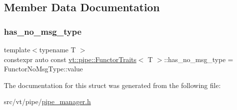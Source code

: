 \subsection{Member Data Documentation}
\mbox{\label{structvt_1_1pipe_1_1_functor_traits_aace8b00c70112f7711ce73f1799f7e00}} 
\subsubsection{\texorpdfstring{has\+\_\+no\+\_\+msg\+\_\+type}{has\_no\_msg\_type}}
{\footnotesize\ttfamily template$<$typename T $>$ \\
constexpr auto const \hyperlink{structvt_1_1pipe_1_1_functor_traits}{vt\+::pipe\+::\+Functor\+Traits}$<$ T $>$\+::has\+\_\+no\+\_\+msg\+\_\+type = Functor\+No\+Msg\+Type\+::value\hspace{0.3cm}{\ttfamily [static]}}



The documentation for this struct was generated from the following file\+:\begin{DoxyCompactItemize}
\item 
src/vt/pipe/\hyperlink{pipe__manager_8h}{pipe\+\_\+manager.\+h}\end{DoxyCompactItemize}
